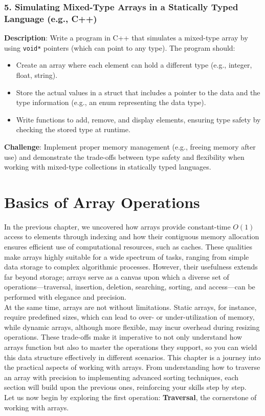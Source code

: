 \documentclass[12pt, oneside]{book}
\begin{document}
	\subsection*{5. Simulating Mixed-Type Arrays in a Statically Typed Language (e.g., C++)}
	\textbf{Description}: Write a program in C++ that simulates a mixed-type array by using \texttt{void*} pointers (which can point to any type). The program should:
	\begin{itemize}
		\item Create an array where each element can hold a different type (e.g., integer, float, string).
		\item Store the actual values in a struct that includes a pointer to the data and the type information (e.g., an enum representing the data type).
		\item Write functions to add, remove, and display elements, ensuring type safety by checking the stored type at runtime.
	\end{itemize}
	
	\textbf{Challenge}: Implement proper memory management (e.g., freeing memory after use) and demonstrate the trade-offs between type safety and flexibility when working with mixed-type collections in statically typed languages.
	
	\chapter{Basics of Array Operations}
	In the previous chapter, we uncovered how arrays provide constant-time \(O(1)\) access to elements through indexing and how their contiguous memory allocation ensures efficient use of computational resources, such as caches. These qualities make arrays highly suitable for a wide spectrum of tasks, ranging from simple data storage to complex algorithmic processes. However, their usefulness extends far beyond storage; arrays serve as a canvas upon which a diverse set of operations—traversal, insertion, deletion, searching, sorting, and access—can be performed with elegance and precision.\\
	At the same time, arrays are not without limitations. Static arrays, for instance, require predefined sizes, which can lead to over- or under-utilization of memory, while dynamic arrays, although more flexible, may incur overhead during resizing operations. These trade-offs make it imperative to not only understand how arrays function but also to master the operations they support, so you can wield this data structure effectively in different scenarios. This chapter is a journey into the practical aspects of working with arrays. From understanding how to traverse an array with precision to implementing advanced sorting techniques, each section will build upon the previous ones, reinforcing your skills step by step.\\ Let us now begin by exploring the first operation: \textbf{Traversal}, the cornerstone of working with arrays.
\end{document}
